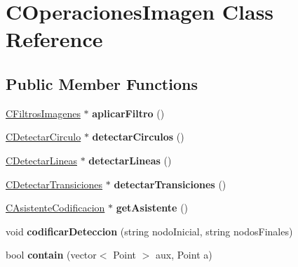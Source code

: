 \hypertarget{classCOperacionesImagen}{}\section{C\+Operaciones\+Imagen Class Reference}
\label{classCOperacionesImagen}
\subsection*{Public Member Functions}
\begin{DoxyCompactItemize}
\item 
\hyperlink{classCFiltrosImagenes}{C\+Filtros\+Imagenes} $\ast$ {\bfseries aplicar\+Filtro} ()\hypertarget{classCOperacionesImagen_a4a2bc277c960648dc2a88aa49e6a4d28}{}\label{classCOperacionesImagen_a4a2bc277c960648dc2a88aa49e6a4d28}

\item 
\hyperlink{classCDetectarCirculo}{C\+Detectar\+Circulo} $\ast$ {\bfseries detectar\+Circulos} ()\hypertarget{classCOperacionesImagen_a8284a380dae8383e63c85fcc9b4aff04}{}\label{classCOperacionesImagen_a8284a380dae8383e63c85fcc9b4aff04}

\item 
\hyperlink{classCDetectarLineas}{C\+Detectar\+Lineas} $\ast$ {\bfseries detectar\+Lineas} ()\hypertarget{classCOperacionesImagen_a0dbb1c8970ca701b6af7bb45dc2a912a}{}\label{classCOperacionesImagen_a0dbb1c8970ca701b6af7bb45dc2a912a}

\item 
\hyperlink{classCDetectarTransiciones}{C\+Detectar\+Transiciones} $\ast$ {\bfseries detectar\+Transiciones} ()\hypertarget{classCOperacionesImagen_a9e025ecb29931b9e472e2989b4ee50a2}{}\label{classCOperacionesImagen_a9e025ecb29931b9e472e2989b4ee50a2}

\item 
\hyperlink{classCAsistenteCodificacion}{C\+Asistente\+Codificacion} $\ast$ {\bfseries get\+Asistente} ()\hypertarget{classCOperacionesImagen_a28f7cbaaff0e626d6f94be6edbe900b8}{}\label{classCOperacionesImagen_a28f7cbaaff0e626d6f94be6edbe900b8}

\item 
void {\bfseries codificar\+Deteccion} (string nodo\+Inicial, string nodos\+Finales)\hypertarget{classCOperacionesImagen_aaac35f5fc47a2a7c8abb8d00fc89879a}{}\label{classCOperacionesImagen_aaac35f5fc47a2a7c8abb8d00fc89879a}

\item 
bool {\bfseries contain} (vector$<$ Point $>$ aux, Point a)\hypertarget{classCOperacionesImagen_ae0b1cc753d1c4f62a2c9dce6f213ba95}{}\label{classCOperacionesImagen_ae0b1cc753d1c4f62a2c9dce6f213ba95}


\end{DoxyCompactItemize}

